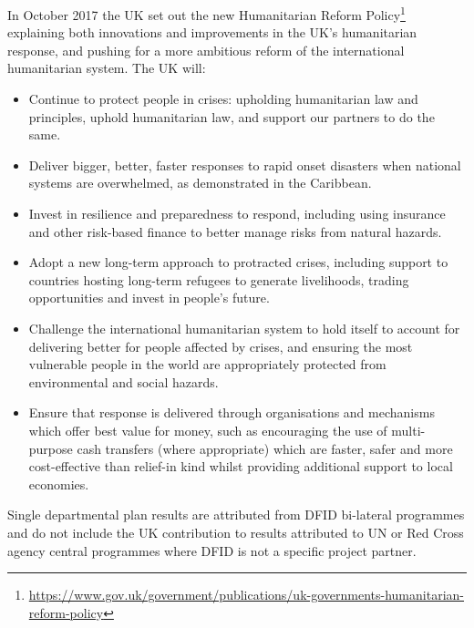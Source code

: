 In October 2017 the UK set out the new Humanitarian Reform Policy\footnote{\href{https://www.gov.uk/government/publications/uk-governments-humanitarian-reform-policy}{https://www.gov.uk/government/publications/uk-governments-humanitarian-reform-policy}} explaining both innovations and improvements in the UK's humanitarian response, and pushing for a more ambitious reform of the international humanitarian system. %
The UK will:
\begin{itemize}
\item Continue to protect people in crises: upholding humanitarian law and principles, uphold humanitarian law, and support our partners to do the same.
\item Deliver bigger, better, faster responses to rapid onset disasters when national systems are overwhelmed, as demonstrated in the Caribbean.
\item Invest in resilience and preparedness to respond, including using insurance and other risk-based finance to better manage risks from natural hazards.
\item Adopt a new long-term approach to protracted crises, including support to countries hosting long-term refugees to generate livelihoods, trading opportunities and invest in people's future.
\item Challenge the international humanitarian system to hold itself to account for delivering better for people affected by crises, and ensuring the most vulnerable people in the world are appropriately protected from environmental and social hazards.
\item Ensure that response is delivered through organisations and mechanisms which offer best value for money, such as encouraging the use of multi-purpose cash transfers (where appropriate) which are faster, safer and more cost-effective than relief-in kind whilst providing additional support to local economies.
\end{itemize}

Single departmental plan results are attributed from DFID bi-lateral programmes and do not include the UK contribution to results attributed to UN or Red Cross agency central programmes where DFID is not a specific project partner. %


\newpage

